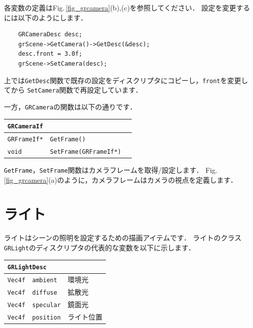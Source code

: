\KLUDGE 各変数の定義はFig.\,\ref{fig_grcamera}(b),(c)を参照してください．
\KLUDGE 設定を変更するには以下のようにします．
\begin{verbatim}
    GRCameraDesc desc;
    grScene->GetCamera()->GetDesc(&desc);
    desc.front = 3.0f;
    grScene->SetCamera(desc);
\end{verbatim}
\KLUDGE 上では\texttt{GetDesc}関数で既存の設定をディスクリプタにコピーし，\texttt{front}を変更してから
\texttt{SetCamera}関数で再設定しています．

\KLUDGE 一方，\texttt{GRCamera}の関数は以下の通りです．

\begin{center}
\begin{tabular}{p{.15\hsize}p{.45\hsize}p{.3\hsize}}
\multicolumn{3}{l}{\texttt{GRCameraIf}}					\\ \midrule
\texttt{GRFrameIf*}	& \texttt{GetFrame()}				&	\\
\texttt{void}		& \texttt{SetFrame(GRFrameIf*)}		&	\\
\end{tabular}
\end{center}

\texttt{GetFrame}，\texttt{SetFrame}関数はカメラフレームを取得/設定します．
Fig.\,\ref{fig_grcamera}(a)のように，カメラフレームはカメラの視点を定義します．

\section{ライト}

\KLUDGE ライトはシーンの照明を設定するための描画アイテムです．
\KLUDGE ライトのクラス\texttt{GRLight}のディスクリプタの代表的な変数を以下に示します．

\begin{center}
\begin{tabular}{p{.15\hsize}p{.45\hsize}p{.3\hsize}}
\multicolumn{3}{l}{\texttt{GRLightDesc}}				\\ \midrule
\texttt{Vec4f}	&	\texttt{ambient}	& 環境光 		\\
\texttt{Vec4f}	&	\texttt{diffuse}	& 拡散光 		\\
\texttt{Vec4f}	&	\texttt{specular}	& 鏡面光		\\
\texttt{Vec4f}	&	\texttt{position}	& ライト位置	\\
\end{tabular}
\end{center}

